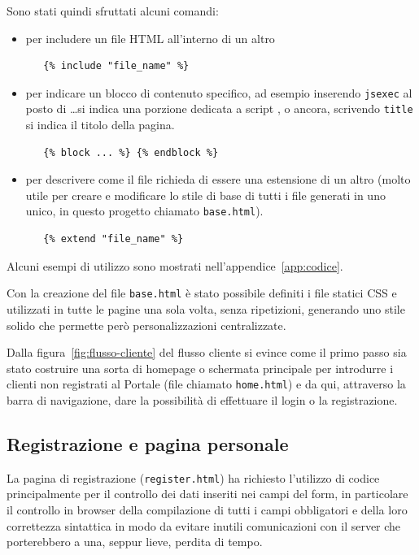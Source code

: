 Sono stati quindi sfruttati alcuni comandi:
\begin{itemize}
 \item per includere un file HTML all'interno di un altro
  \begin{verbatim} 
   {% include "file_name" %} 
  \end{verbatim}
 \item per indicare un blocco di contenuto specifico, ad esempio inserendo \texttt{jsexec} al posto di \dots si indica una porzione dedicata a script {\js}, o ancora, scrivendo \texttt{title} si indica il titolo della pagina.
  \begin{verbatim} 
   {% block ... %} {% endblock %}
  \end{verbatim}
 \item per descrivere come il file richieda di essere una estensione di un altro (molto utile per creare e modificare lo stile di base di tutti i file generati in uno unico, in questo progetto chiamato \texttt{base.html}).
  \begin{verbatim} 
   {% extend "file_name" %} 
  \end{verbatim} 
\end{itemize}
Alcuni esempi di utilizzo sono mostrati nell'appendice~\ref{app:codice}.

Con la creazione del file \texttt{base.html} è stato possibile definiti i file statici CSS e {\js} utilizzati in tutte le pagine una sola volta, senza ripetizioni, generando uno stile solido che permette però personalizzazioni centralizzate.

Dalla figura~\ref{fig:flusso-cliente} del flusso cliente si evince come il primo passo sia stato costruire una sorta di homepage o schermata principale per introdurre i clienti non registrati al Portale (file chiamato \texttt{home.html}) e da qui, attraverso la barra di navigazione, dare la possibilità di effettuare il login o la registrazione.

\subsection*{Registrazione e pagina personale}
\label{subs:preg-ppers}
La pagina di registrazione (\texttt{register.html}) ha richiesto l'utilizzo di codice {\js} principalmente per il controllo dei dati inseriti nei campi del form, in particolare il controllo in browser della compilazione di tutti i campi obbligatori e della loro correttezza sintattica in modo da evitare inutili comunicazioni con il server che porterebbero a una, seppur lieve, perdita di tempo.


